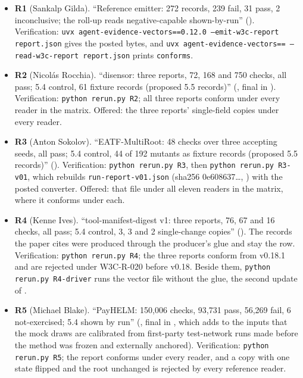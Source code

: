 \begin{flushleft}
\begin{itemize}
\item \textbf{R1} (Sankalp Gilda). ``Reference emitter: 272 records, 239 fail, 31 pass, 2 inconclusive; the roll-up reads negative-capable shown-by-run'' (). Verification: \texttt{uvx agent-evidence-vectors==0.12.0 --emit-w3c-report report.json} gives the posted bytes, and \texttt{uvx agent-evidence-vectors==\aevreadrelease{} --read-w3c-report report.json} prints \texttt{conforms}.
\item \textbf{R2} (Nicol\'as Rocchia). ``disensor: three reports, 72, 168 and 750 checks, all pass; 5.4 control, 61 fixture records (proposed 5.5 records)'' (, final in ). Verification: \texttt{python rerun.py R2}; all three reports conform under every reader in the matrix. Offered: the three reports' single-field copies under every reader.
\item \textbf{R3} (Anton Sokolov). ``EATF-MultiRoot: 48 checks over three accepting seeds, all pass; 5.4 control, 44 of 192 mutants as fixture records (proposed 5.5 records)'' (). Verification: \texttt{python rerun.py R3}, then \texttt{python rerun.py R3-v01}, which rebuilds \texttt{run-report-v01.json} (sha256 0e608637\ldots, ) with the posted converter. Offered: that file under all eleven readers in the matrix, where it conforms under each.
\item \textbf{R4} (Kenne Ives). ``tool-manifest-digest v1: three reports, 76, 67 and 16 checks, all pass; 5.4 control, 3, 3 and 2 single-change copies'' (). The records the paper cites were produced through the producer's glue and stay the row. Verification: \texttt{python rerun.py R4}; the three reports conform from v0.18.1 and are rejected under W3C-R-020 before v0.18. Beside them, \texttt{python rerun.py R4-driver} runs the vector file without the glue, the second update of .
\item \textbf{R5} (Michael Blake). ``PayHELM: 150,006 checks, 93,731 pass, 56,269 fail, 6 not-exercised; 5.4 shown by run'' (, final in , which adds to the inputs that the mock draws are calibrated from first-party test-network runs made before the method was frozen and externally anchored). Verification: \texttt{python rerun.py R5}; the report conforms under every reader, and a copy with one state flipped and the root unchanged is rejected by every reference reader.

\end{itemize}
\end{flushleft}

